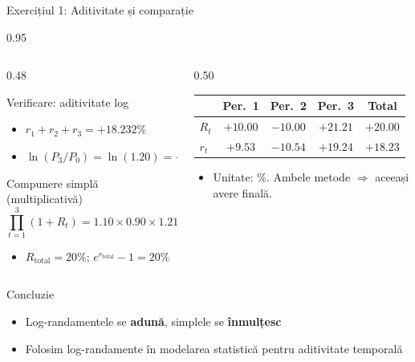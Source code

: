 \documentclass[9pt, aspectratio=169, t]{beamer}
\begin{document}
\begin{frame}[shrink=5]{Exercițiul 1: Aditivitate și comparație}
    \begin{cminipage}{0.95\textwidth}
    \begin{columns}[T]
    \begin{column}{0.48\textwidth}
    \begin{exampleblock}{Verificare: aditivitate log}
    \begin{itemize}\setlength{\itemsep}{0pt}
        \item $r_1 + r_2 + r_3 = \mathbf{+18.232\%}$
        \item $\ln(P_3/P_0) = \ln(1.20) = \mathbf{+18.232\%}$ \checkmark
    \end{itemize}
    \end{exampleblock}
    \begin{block}{Compunere simplă (multiplicativă)}
    \[
    \textstyle\prod_{t=1}^{3}(1+R_t) = 1.10 \times 0.90 \times 1.2121 = 1.20
    \]
    \begin{itemize}\setlength{\itemsep}{0pt}
        \item $R_{\text{total}} = 20\%$; \; $e^{r_{\text{total}}} - 1 = 20\%$ \checkmark
    \end{itemize}
    \end{block}
    \end{column}
    \begin{column}{0.50\textwidth}
    \begin{center}
    {\small
    \renewcommand{\arraystretch}{1.2}
    \begin{tabular}{lcccc}
    \toprule
    & Per.\ 1 & Per.\ 2 & Per.\ 3 & \textbf{Total} \\
    \midrule
    $R_t$ & $+10.00$ & $-10.00$ & $+21.21$ & $+20.00$ \\
    $r_t$ & $+9.53$ & $-10.54$ & $+19.24$ & $+18.23$ \\
    \bottomrule
    \end{tabular}
    }
    \end{center}
    \vspace{0.1cm}
    \begin{itemize}\setlength{\itemsep}{0pt}
        \item {\footnotesize Unitate: \%. Ambele metode $\Rightarrow$ aceeași avere finală.}
    \end{itemize}
    \end{column}
    \end{columns}
    \vspace{0.1cm}
    \begin{alertblock}{Concluzie}
    \begin{itemize}\setlength{\itemsep}{0pt}
        \item Log-randamentele se \textbf{adună}, simplele se \textbf{înmulțesc}
        \item Folosim log-randamente în modelarea statistică pentru aditivitate temporală
    \end{itemize}
    \end{alertblock}
    \end{cminipage}
\end{frame}
\end{document}
